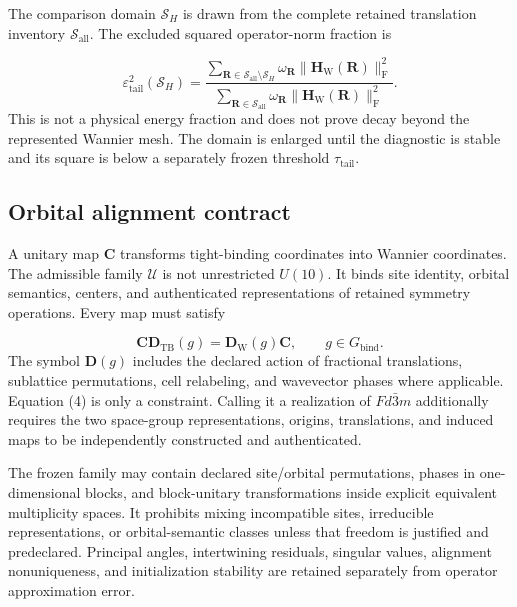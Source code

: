 \documentclass[11pt]{article}
\newenvironment{prospective}{\color{prospectivered}}{}
\begin{document}
\begin{prospective}
The comparison domain $\mathcal S_H$ is drawn from the complete retained translation inventory $\mathcal S_{\mathrm{all}}$. The excluded squared operator-norm fraction is

\begin{equation*}
\varepsilon_{\mathrm{tail}}^2(\mathcal S_H)
=
\frac{
\displaystyle\sum_{\mathbf R\in
\mathcal S_{\mathrm{all}}\setminus\mathcal S_H}
\omega_{\mathbf R}\|\mathbf H_{\mathrm W}(\mathbf R)\|_{\mathrm F}^2
}{
\displaystyle\sum_{\mathbf R\in\mathcal S_{\mathrm{all}}}
\omega_{\mathbf R}\|\mathbf H_{\mathrm W}(\mathbf R)\|_{\mathrm F}^2
}.
\tag{3}
\end{equation*}
This is not a physical energy fraction and does not prove decay beyond the represented Wannier mesh. The domain is enlarged until the diagnostic is stable and its square is below a separately frozen threshold $\tau_{\mathrm{tail}}$.

\subsection{Orbital alignment contract}
A unitary map $\mathbf C$ transforms tight-binding coordinates into Wannier coordinates. The admissible family $\mathcal U$ is not unrestricted $U(10)$. It binds site identity, orbital semantics, centers, and authenticated representations of retained symmetry operations. Every map must satisfy

\begin{equation*}
\mathbf C\mathbf D_{\mathrm{TB}}(g)
=
\mathbf D_{\mathrm W}(g)\mathbf C,
\qquad g\in G_{\mathrm{bind}}.
\tag{4}
\end{equation*}
The symbol $\mathbf D(g)$ includes the declared action of fractional translations, sublattice permutations, cell relabeling, and wavevector phases where applicable. Equation (4) is only a constraint. Calling it a realization of $Fd\bar{3}m$ additionally requires the two space-group representations, origins, translations, and induced maps to be independently constructed and authenticated.

The frozen family may contain declared site/orbital permutations, phases in one- dimensional blocks, and block-unitary transformations inside explicit equivalent multiplicity spaces. It prohibits mixing incompatible sites, irreducible representations, or orbital-semantic classes unless that freedom is justified and predeclared. Principal angles, intertwining residuals, singular values, alignment nonuniqueness, and initialization stability are retained separately from operator approximation error.


\end{prospective}
\end{document}
